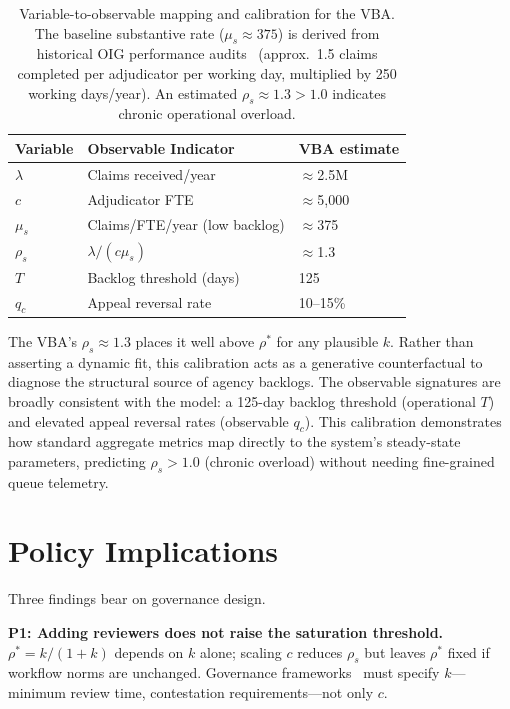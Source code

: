 \documentclass[runningheads]{llncs}
\begin{document}
\begin{table}[t]
\centering
\caption{Variable-to-observable mapping and calibration for the VBA. The baseline substantive rate ($\mu_s \approx 375$) is derived from historical OIG performance audits~\cite[p.\ 11]{vaoig2024} (approx.\ 1.5 claims completed per adjudicator per working day, multiplied by 250 working days/year). An estimated $\rho_s \approx 1.3 > 1.0$ indicates chronic operational overload.}
\label{tab:operationalization}
\begin{tabular}{@{}lll@{}}
\toprule
Variable & Observable Indicator & VBA estimate \\
\midrule
$\lambda$ & Claims received/year & $\approx$2.5M \\
$c$ & Adjudicator FTE & $\approx$5,000 \\
$\mu_s$ & Claims/FTE/year (low backlog) & $\approx$375 \\
$\rho_s$ & $\lambda/(c\mu_s)$ & $\approx$1.3 \\
$T$ & Backlog threshold (days) & 125 \\
$q_c$ & Appeal reversal rate & 10--15\% \\
\bottomrule
\end{tabular}
\vspace{-10pt}
\end{table}

The VBA's $\rho_s \approx 1.3$ places it well above $\rho^*$ for any plausible
$k$. Rather than asserting a dynamic fit, this calibration acts as a generative counterfactual to diagnose the structural source of agency backlogs. The observable signatures are broadly consistent with the model: a 125-day backlog threshold (operational $T$) and elevated appeal reversal rates (observable $q_c$). This calibration demonstrates how standard aggregate metrics map directly to the system's steady-state parameters, predicting $\rho_s > 1.0$ (chronic overload) without needing fine-grained queue telemetry.

\section{Policy Implications}
\label{sec:policy}

Three findings bear on governance design.

\smallskip\noindent\textbf{P1: Adding reviewers does not raise the saturation threshold.}
$\rho^* = k/(1+k)$ depends on $k$ alone; scaling $c$ reduces $\rho_s$ but leaves
$\rho^*$ fixed if workflow norms are unchanged. Governance frameworks~\cite{euaiact2024,nist2023}
must specify $k$---minimum review time, contestation requirements---not only $c$.
\end{document}
